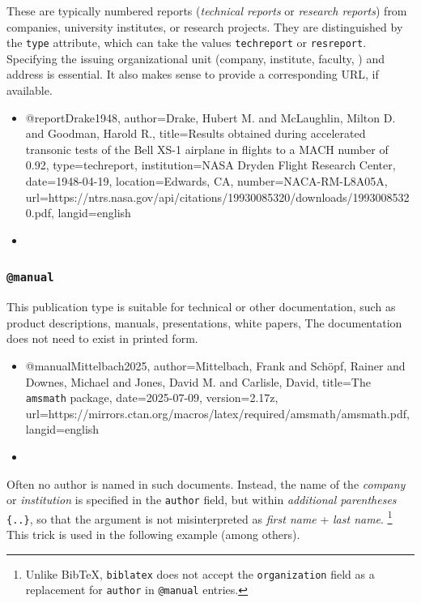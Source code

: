 These are typically numbered reports (\emph{technical reports} or \emph{research
reports}) from companies, university institutes, or research projects. They are
distinguished by the \texttt{type} attribute, which can take the values
\texttt{techreport} or \texttt{resreport}. Specifying the issuing organizational
unit (company, institute, faculty, \etc) and address is essential. It also makes
sense to provide a corresponding URL, if available.
%
\begin{itemize}
\item[]
\begin{GenericCode}[numbers=none]
@report{Drake1948,
  author={Drake, Hubert M. and McLaughlin, Milton D. and Goodman, Harold R.},
  title={Results obtained during accelerated transonic tests of the {Bell} {XS-1} airplane in flights to a {MACH} number of 0.92},
  type={techreport},
  institution={NASA Dryden Flight Research Center},
  date={1948-04-19},
  location={Edwards, CA},
  number={NACA-RM-L8A05A},
  url={https://ntrs.nasa.gov/api/citations/19930085320/downloads/19930085320.pdf},
  langid={english}
}
\end{GenericCode}
\item[\cite{Drake1948}] 
\end{itemize}


\subsubsection{\texttt{\bfseries @manual}}
\label{sec:@manual}

This publication type is suitable for technical or other documentation, such as
product descriptions, manuals, presentations, white papers, \etc The
documentation does not need to exist in printed form.
%
\begin{itemize}
\item[]
\begin{GenericCode}[numbers=none]
@manual{Mittelbach2025,
  author={Mittelbach, Frank and Schöpf, Rainer and Downes, Michael and Jones, David M. and Carlisle, David},
  title={The \texttt{amsmath} package},
  date={2025-07-09},
  version={2.17z},
  url={https://mirrors.ctan.org/macros/latex/required/amsmath/amsmath.pdf},
  langid={english}
}
\end{GenericCode}
\item[\cite{Mittelbach2025}] 
\end{itemize}
%
Often no author is named in such documents. Instead, the name of the
\emph{company} or \emph{institution} is specified in the \texttt{author} field,
but within \emph{additional parentheses} \texttt{\{..\}}, so that the
argument is not misinterpreted as \emph{first name} + \emph{last name}.%
\footnote{Unlike BibTeX, \texttt{biblatex} does not accept the
\texttt{organization} field as a replacement for \texttt{author} in
\texttt{@manual} entries.}
This trick is used in the following example (among others).

